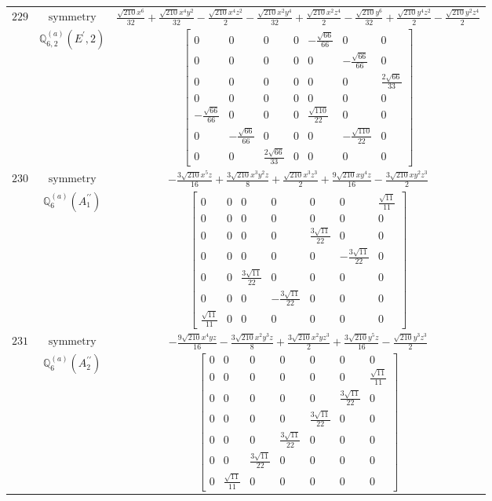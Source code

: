 \documentclass[fleqn,8pt,landscape]{jsarticle}
\begin{document}
\begin{longtable}{ccc}
$ 229 $ & $ \text{symmetry} $ & $ \frac{\sqrt{210} x^{6}}{32} + \frac{\sqrt{210} x^{4} y^{2}}{32} - \frac{\sqrt{210} x^{4} z^{2}}{2} - \frac{\sqrt{210} x^{2} y^{4}}{32} + \frac{\sqrt{210} x^{2} z^{4}}{2} - \frac{\sqrt{210} y^{6}}{32} + \frac{\sqrt{210} y^{4} z^{2}}{2} - \frac{\sqrt{210} y^{2} z^{4}}{2} $ \\
$  $ & $ \mathbb{Q}_{6,2}^{(a)}(E^{\prime},2) $ & $ \begin{bmatrix} 0 & 0 & 0 & 0 & - \frac{\sqrt{66}}{66} & 0 & 0 \\ 0 & 0 & 0 & 0 & 0 & - \frac{\sqrt{66}}{66} & 0 \\ 0 & 0 & 0 & 0 & 0 & 0 & \frac{2 \sqrt{66}}{33} \\ 0 & 0 & 0 & 0 & 0 & 0 & 0 \\ - \frac{\sqrt{66}}{66} & 0 & 0 & 0 & \frac{\sqrt{110}}{22} & 0 & 0 \\ 0 & - \frac{\sqrt{66}}{66} & 0 & 0 & 0 & - \frac{\sqrt{110}}{22} & 0 \\ 0 & 0 & \frac{2 \sqrt{66}}{33} & 0 & 0 & 0 & 0 \end{bmatrix} $ \\ \hline
$ 230 $ & $ \text{symmetry} $ & $ - \frac{3 \sqrt{210} x^{5} z}{16} + \frac{3 \sqrt{210} x^{3} y^{2} z}{8} + \frac{\sqrt{210} x^{3} z^{3}}{2} + \frac{9 \sqrt{210} x y^{4} z}{16} - \frac{3 \sqrt{210} x y^{2} z^{3}}{2} $ \\
$  $ & $ \mathbb{Q}_{6}^{(a)}(A_{1}^{\prime\prime}) $ & $ \begin{bmatrix} 0 & 0 & 0 & 0 & 0 & 0 & \frac{\sqrt{11}}{11} \\ 0 & 0 & 0 & 0 & 0 & 0 & 0 \\ 0 & 0 & 0 & 0 & \frac{3 \sqrt{11}}{22} & 0 & 0 \\ 0 & 0 & 0 & 0 & 0 & - \frac{3 \sqrt{11}}{22} & 0 \\ 0 & 0 & \frac{3 \sqrt{11}}{22} & 0 & 0 & 0 & 0 \\ 0 & 0 & 0 & - \frac{3 \sqrt{11}}{22} & 0 & 0 & 0 \\ \frac{\sqrt{11}}{11} & 0 & 0 & 0 & 0 & 0 & 0 \end{bmatrix} $ \\ \hline
$ 231 $ & $ \text{symmetry} $ & $ - \frac{9 \sqrt{210} x^{4} y z}{16} - \frac{3 \sqrt{210} x^{2} y^{3} z}{8} + \frac{3 \sqrt{210} x^{2} y z^{3}}{2} + \frac{3 \sqrt{210} y^{5} z}{16} - \frac{\sqrt{210} y^{3} z^{3}}{2} $ \\
$  $ & $ \mathbb{Q}_{6}^{(a)}(A_{2}^{\prime\prime}) $ & $ \begin{bmatrix} 0 & 0 & 0 & 0 & 0 & 0 & 0 \\ 0 & 0 & 0 & 0 & 0 & 0 & \frac{\sqrt{11}}{11} \\ 0 & 0 & 0 & 0 & 0 & \frac{3 \sqrt{11}}{22} & 0 \\ 0 & 0 & 0 & 0 & \frac{3 \sqrt{11}}{22} & 0 & 0 \\ 0 & 0 & 0 & \frac{3 \sqrt{11}}{22} & 0 & 0 & 0 \\ 0 & 0 & \frac{3 \sqrt{11}}{22} & 0 & 0 & 0 & 0 \\ 0 & \frac{\sqrt{11}}{11} & 0 & 0 & 0 & 0 & 0 \end{bmatrix} $ \\ \hline

\end{longtable}
\end{document}
